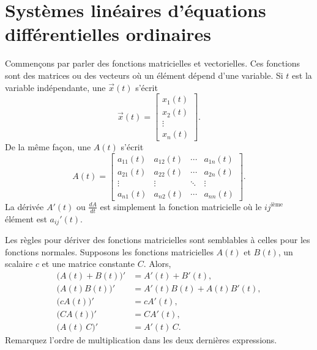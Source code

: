 
\sectionnewpage
\section{Systèmes linéaires d'équations différentielles ordinaires}
\label{linsystems:section}


Commençons par parler des fonctions matricielles et vectorielles. Ces fonctions sont des matrices ou des vecteurs où un élément dépend d'une variable. Si $t$ est la variable indépendante, une
\emph{}
$\vec{x}(t)$ s'écrit
\begin{equation*}
\vec{x}(t) = \begin{bmatrix}
x_1(t) \\
x_2(t) \\
\vdots \\
x_n(t)
\end{bmatrix} .
\end{equation*}
De la même façon, une \emph{} $A(t)$ s'écrit
\begin{equation*}
A(t) =
\begin{bmatrix}
a_{11}(t) & a_{12}(t) & \cdots & a_{1n}(t) \\
a_{21}(t) & a_{22}(t) & \cdots & a_{2n}(t) \\
\vdots & \vdots & \ddots & \vdots \\
a_{n1}(t) & a_{n2}(t) & \cdots & a_{nn}(t)
\end{bmatrix} .
\end{equation*}
La dérivée $A'(t)$ ou $\frac{dA}{dt}$ est simplement la fonction matricielle où le $ij^{\text{ième}}$ élément est $a_{ij}'(t)$.

Les règles pour dériver des fonctions matricielles sont semblables à celles pour les fonctions normales. Supposons les fonctions matricielles $A(t)$ et $B(t)$, un scalaire $c$ et une matrice constante $C$. Alors,
\begin{align*}
\bigl(A(t)+B(t)\bigr)' & = A'(t) + B'(t), \\
\bigl(A(t)B(t)\bigr)' & = A'(t)B(t) + A(t)B'(t), \\
\bigl(cA(t)\bigr)' & = cA'(t), \\
\bigl(CA(t)\bigr)' & = CA'(t), \\
\bigl(A(t)\,C\bigr)' & = A'(t)\,C .
\end{align*}
Remarquez l'ordre de multiplication dans les deux dernières expressions.

